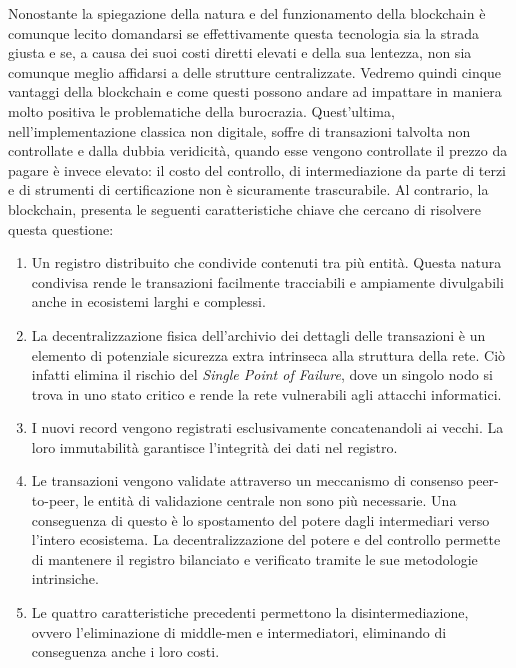Nonostante la spiegazione della natura e del funzionamento della blockchain è comunque
lecito domandarsi se effettivamente questa tecnologia sia la strada giusta e se, a
causa dei suoi costi diretti elevati e della sua lentezza, non sia comunque meglio
affidarsi a delle strutture centralizzate.
Vedremo quindi cinque vantaggi della blockchain e come questi possono andare ad impattare
in maniera molto positiva le problematiche della burocrazia.
Quest'ultima, nell'implementazione classica non digitale, soffre di transazioni talvolta
non controllate e dalla dubbia veridicità, quando esse vengono controllate il prezzo
da pagare è invece elevato: il costo del controllo, di intermediazione da parte di terzi
e di strumenti di certificazione non è sicuramente trascurabile.
Al contrario, la blockchain, presenta le seguenti caratteristiche chiave che cercano di
risolvere questa questione:
\begin{enumerate}
    \item Un registro distribuito che condivide contenuti tra più entità.
    Questa natura condivisa rende le transazioni facilmente tracciabili e
    ampiamente divulgabili anche in ecosistemi larghi e complessi.
    \item La decentralizzazione fisica dell'archivio dei dettagli delle transazioni
    è un elemento di potenziale sicurezza extra intrinseca alla struttura della rete.
    Ciò infatti elimina il rischio del \emph{Single Point of Failure}, dove un singolo
    nodo si trova in uno stato critico e rende la rete vulnerabili agli attacchi informatici.
    \item I nuovi record vengono registrati esclusivamente concatenandoli ai vecchi.
    La loro immutabilità garantisce l'integrità dei dati nel registro.
    \newline
    \newline
    \item Le transazioni vengono validate attraverso un meccanismo di consenso peer-to-peer,
    le entità di validazione centrale non sono più necessarie.
    Una conseguenza di questo è lo spostamento del potere dagli intermediari verso
    l'intero ecosistema. La decentralizzazione del potere e del controllo
    permette di mantenere il registro
    bilanciato e verificato tramite le sue metodologie intrinsiche.
    \item Le quattro caratteristiche precedenti permettono la disintermediazione,
    ovvero l'eliminazione di middle-men e intermediatori, eliminando di conseguenza
    anche i loro costi.
\end{enumerate}

